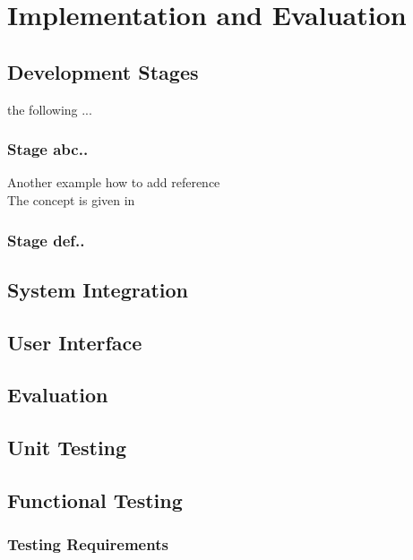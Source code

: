 
\chapter{Implementation and Evaluation} %

\label{Chapter4} %


\section{Development Stages }
the following ...
\subsection{Stage abc..}
Another example how to add reference \\
The concept is given in \citep{inth}
\subsection{Stage def..}

\section{System Integration }
\section{User Interface}
\section{Evaluation}
\section{Unit Testing}
\section{Functional Testing}
\subsection{Testing Requirements}
